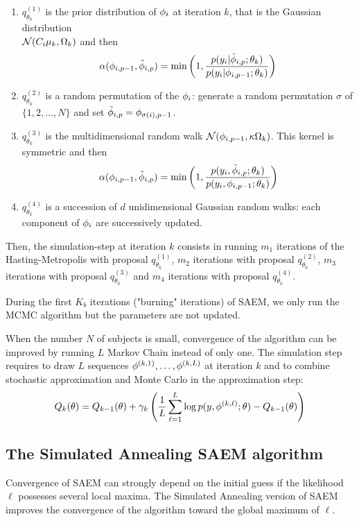 \begin{enumerate}
\item $q_{\theta_k}^{(1)}$  is the prior distribution of ${\phi}_i$ at iteration $k$, that is the Gaussian distribution \\
${\cal N}(C_i\fixed_effect_k,\IIV_k)$ and then
$$ \alpha( {\phi}_{i,p-1} ,  \tilde{{\phi}}_{i,p} ) = \min \left(1, \frac{ p( y_i|\tilde{{\phi}}_{i,p};\theta_k) } { p( y_i|{\phi}_{i,p-1};\theta_k) } \right)$$
\item $q_{\theta_k}^{(2)}$ is a random permutation of the ${\phi}_i$: generate a random permutation $\sigma$ of $\{1,2,\ldots,N\}$ and set $\tilde{{\phi}}_{i,p}={\phi}_{\sigma(i),p-1}$.
\item $q_{\theta_k}^{(3)}$ is the multidimensional random walk ${\cal N}( {\phi}_{i,p-1} , \kappa{\Omega}_k)$. This kernel is symmetric and then 
$$ \alpha( {\phi}_{i,p-1} ,  \tilde{{\phi}}_{i,p} ) = \min \left(1, \frac{ p( y_i,\tilde{{\phi}}_{i,p};\theta_k) } { p( y_i,{\phi}_{i,p-1};\theta_k) } \right)$$
\item $q_{\theta_k}^{(4)}$ is a succession of $d$ unidimensional Gaussian random walks: each component of ${\phi}_i$ are successively updated.
\end{enumerate}
Then, the simulation-step at iteration $k$ consists in running $m_1$ iterations of the Hasting-Metropolis with proposal $q_{\theta_k}^{(1)}$, $m_2$ iterations with proposal $q_{\theta_k}^{(2)}$, $m_3$ iterations with proposal $q_{\theta_k}^{(3)}$ and $m_4$ iterations with proposal $q_{\theta_k}^{(4)}$.


 During the first $K_b$ iterations ("burning" iterations) of SAEM, we only run the MCMC algorithm but the parameters are not updated.

  When the number $N$ of subjects is small, convergence of the algorithm can be improved by running $L$ Markov Chain instead of only one. The simulation step requires to draw $L$ sequences $ { {\phi}^{(k,1)}} ,\ldots , { {\phi}^{(k,L)}} $ at iteration $k$ and to combine stochastic approximation and Monte Carlo in the approximation step:
\begin{equation} \label{approx2}
 Q_k(\theta) = Q_{k-1}(\theta) + \gamma_k \left( \frac{1}{L}\sum_{\ell=1}^{L} \log p(y, { {\phi}^{(k,\ell)}} ;\theta) - Q_{k-1}(\theta) \right)
\end{equation}


\subsection{The Simulated Annealing SAEM algorithm}
Convergence of SAEM can strongly depend on the initial guess if the likelihood $\ell$ possesses several local maxima. The Simulated Annealing version of SAEM improves the convergence of the algorithm toward the global maximum of $\ell$.


